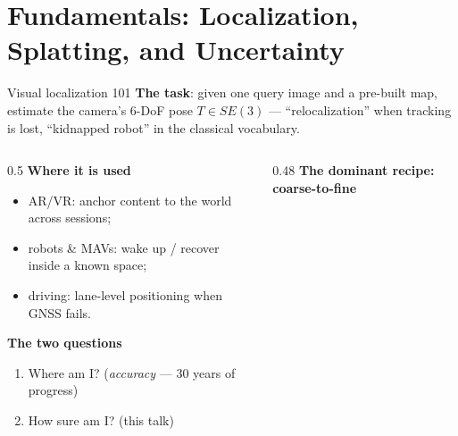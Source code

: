 \documentclass[aspectratio=169,10pt]{beamer}
\begin{document}
\section{Fundamentals: Localization, Splatting, and Uncertainty}

\begin{frame}{Visual localization 101}
  \textbf{The task}: given one query image and a pre-built map, estimate the
  camera's 6-DoF pose $T \in SE(3)$ --- ``relocalization'' when tracking is
  lost, ``kidnapped robot'' in the classical vocabulary.
  \vspace{1mm}
  \begin{columns}[T]
    \begin{column}{0.5\textwidth}
      \textbf{Where it is used}
      \begin{itemize}
        \item AR/VR: anchor content to the world across sessions;
        \item robots \& MAVs: wake up / recover inside a known space;
        \item driving: lane-level positioning when GNSS fails.
      \end{itemize}
      \textbf{The two questions}
      \begin{enumerate}
        \item Where am I? \hfill (\emph{accuracy} --- 30 years of progress)
        \item How sure am I? \hfill (\alert{this talk})
      \end{enumerate}
    \end{column}
    \begin{column}{0.48\textwidth}
      \textbf{The dominant recipe: coarse-to-fine}
      \vspace{1mm}
      \begin{center}
\end{center}
\end{column}
\end{columns}
\end{frame}
\end{document}
